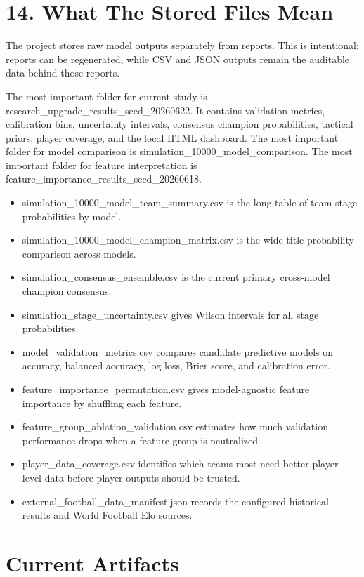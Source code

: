 \documentclass[10pt]{article}
\begin{document}
\section{14. What The Stored Files Mean}

The project stores raw model outputs separately from reports. This is intentional: reports can be regenerated, while CSV and JSON outputs remain the auditable data behind those reports.

The most important folder for current study is research\_upgrade\_results\_seed\_20260622. It contains validation metrics, calibration bins, uncertainty intervals, consensus champion probabilities, tactical priors, player coverage, and the local HTML dashboard. The most important folder for model comparison is simulation\_10000\_model\_comparison. The most important folder for feature interpretation is feature\_importance\_results\_seed\_20260618.

\begin{itemize}
  \item simulation\_10000\_model\_team\_summary.csv is the long table of team stage probabilities by model.
  \item simulation\_10000\_model\_champion\_matrix.csv is the wide title-probability comparison across models.
  \item simulation\_consensus\_ensemble.csv is the current primary cross-model champion consensus.
  \item simulation\_stage\_uncertainty.csv gives Wilson intervals for all stage probabilities.
  \item model\_validation\_metrics.csv compares candidate predictive models on accuracy, balanced accuracy, log loss, Brier score, and calibration error.
  \item feature\_importance\_permutation.csv gives model-agnostic feature importance by shuffling each feature.
  \item feature\_group\_ablation\_validation.csv estimates how much validation performance drops when a feature group is neutralized.
  \item player\_data\_coverage.csv identifies which teams most need better player-level data before player outputs should be trusted.
  \item external\_football\_data\_manifest.json records the configured historical-results and World Football Elo sources.
\end{itemize}

\newpage

\section{Current Artifacts}
\end{document}
